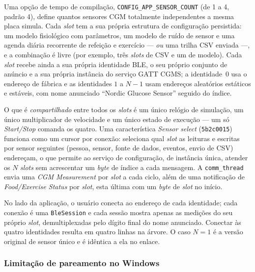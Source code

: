 Uma opção de tempo de compilação, \texttt{CONFIG\_APP\_SENSOR\_COUNT} (de 1 a
4, padrão 4), define quantos sensores CGM totalmente independentes a mesma
placa simula. Cada \textit{slot} tem a sua própria estrutura de configuração
persistida: um modelo fisiológico com parâmetros, um modelo de ruído de
sensor e uma agenda diária recorrente de refeição e exercício --- \emph{ou}
uma trilha CSV enviada ---, e a combinação é livre (por exemplo, três
\textit{slots} de CSV e um de modelo). Cada \textit{slot} recebe ainda a sua
própria identidade BLE, o seu próprio conjunto de anúncio e a sua própria
instância do serviço GATT CGMS; a identidade~0 usa o endereço de fábrica e as
identidades $1$ a $N-1$ usam endereços aleatórios estáticos e estáveis, com
nome anunciado ``Nordic Glucose Sensor'' seguido do índice.

O que é \emph{compartilhado} entre todos os \textit{slots} é um único relógio
de simulação, um único multiplicador de velocidade e um único estado de
execução --- um só \emph{Start/Stop} comanda os quatro. Uma característica
\textit{Sensor select} (\texttt{5b2c0015}) funciona como um cursor por
conexão: seleciona qual \textit{slot} as leituras e escritas por sensor
seguintes (pessoa, sensor, fonte de dados, eventos, envio de CSV) endereçam,
o que permite ao serviço de configuração, de instância única, atender os $N$
\textit{slots} sem acrescentar um \textit{byte} de índice a cada mensagem. A
\texttt{comm\_thread} envia uma \textit{CGM Measurement} por \textit{slot} a
cada ciclo, além de uma notificação de \textit{Food/Exercise Status} por
\textit{slot}, esta última com um \textit{byte} de \textit{slot} no início.

No lado da aplicação, o usuário conecta ao endereço de cada identidade; cada
conexão é uma \texttt{BleSession} e cada sessão mostra apenas as medições do
seu próprio \textit{slot}, demultiplexadas pelo dígito final do nome
anunciado. Conectar às quatro identidades resulta em quatro linhas na árvore.
O caso $N = 1$ é a versão original de sensor único e é idêntica a ela no
enlace.

\subsubsection{Limitação de pareamento no Windows}
\label{sec:multi-sensor-windows}

